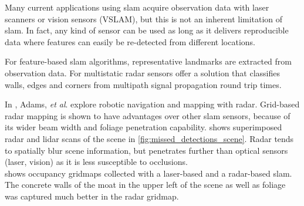 Many current applications using slam acquire observation data with laser scanners or vision sensors (VSLAM), but this is not an inherent limitation of slam. In fact, any kind of sensor can be used as long as it delivers reproducible data where features can easily be re-detected from different locations.

For feature-based slam algorithms, representative landmarks are extracted from observation data. For multistatic radar sensors \cite{Deissler2013,Deissler2012,Seitz2008,Deissler2009} offer a solution that classifies walls, edges and corners from multipath signal propagation round trip times.

In \cite{Adams2012}, Adams, \textit{et al}. explore robotic navigation and mapping with radar. Grid-based radar mapping is shown to have advantages over other slam sensors, because of its wider beam width and foliage penetration capability.  shows superimposed radar and lidar scans of the scene in \cref{fig:missed_detections_scene}. Radar tends to spatially blur scene information, but penetrates further than optical sensors (laser, vision) as it is less susceptible to occlusions.\\
 shows occupancy gridmaps collected with a laser-based and a radar-based slam. The concrete walls of the moat in the upper left of the scene as well as foliage was captured much better in the radar gridmap.

